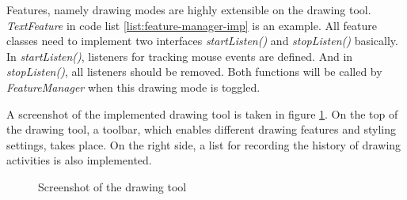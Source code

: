 Features, namely drawing modes are highly extensible on the drawing tool. \textit{TextFeature} in code list \ref{list:feature-manager-imp} is an example. All feature classes need to implement two interfaces \textit{startListen()} and \textit{stopListen()} basically. In \textit{startListen()}, listeners for tracking mouse events are defined. And in \textit{stopListen()}, all listeners should be removed. Both functions will be called by \textit{FeatureManager} when this drawing mode is toggled.

A screenshot of the implemented drawing tool is taken in figure \ref{fig:ss-editor}. On the top of the drawing tool, a toolbar, which enables different drawing features and styling settings, takes place. On the right side, a list for recording the history of drawing activities is also implemented.

\begin{figure}[!htbp]
  \centering
  \caption{Screenshot of the drawing tool}
  \label{fig:ss-editor}
\end{figure}